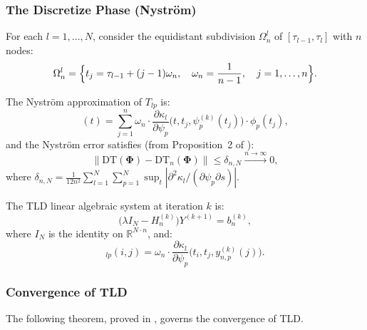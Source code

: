\documentclass[12pt, a4paper]{article}
\newcommand{\norm}[1]{\left\| #1 \right\|}
\newcommand{\abs}[1]{\left| #1 \right|}
\newcommand{\Hn}{H_{n}^{(k)}}
\newcommand{\DT}{\mathrm{DT}}
\newcommand{\DTn}{\mathrm{DT}_{n}}
\newcommand{\R}{\mathbb{R}}
\begin{document}
\subsubsection{The Discretize Phase (Nystr\"{o}m)}

For each $l = 1, \ldots, N$, consider the equidistant
subdivision $\Omega_n^l$ of $[\tau_{l-1}, \tau_l]$ with $n$
nodes:
\begin{equation*}
  \Omega_n^l = \Bigl\{
    t_j = \tau_{l-1} + (j-1)\omega_n,
    \quad \omega_n = \frac{1}{n-1},
    \quad j = 1, \ldots, n
  \Bigr\}.
\end{equation*}

The Nystr\"{o}m approximation of $T_{lp}$ is:
\begin{equation}
  [T_{n,lp}(\boldsymbol{\Psi}^{(k)}) \phi_p](t) =
  \sum_{j=1}^{n} \omega_n \cdot
  \frac{\partial \kappa_l}{\partial \psi_p}
  \bigl(t, t_j, \psi_p^{(k)}(t_j)\bigr)
  \cdot \phi_p(t_j),
  \label{eq:nystrom}
\end{equation}
and the Nystr\"{o}m error satisfies (from Proposition~2 of
\cite{sedka2025}):
\begin{equation}
  \norm{\DT(\boldsymbol{\Phi}) - \DTn(\boldsymbol{\Phi})}
  \leq \delta_{n,N}
  \xrightarrow{n \to \infty} 0,
  \label{eq:nysterror}
\end{equation}
where
$\delta_{n,N} = \frac{1}{12n^2} \sum_{l=1}^N \sum_{p=1}^N
\sup_{t} \abs{\partial^2 \kappa_l / (\partial \psi_p \partial s)}$.

The TLD linear algebraic system at iteration $k$ is:
\begin{equation}
  \bigl(\lambda I_N - \Hn\bigr) Y^{(k+1)} = b_n^{(k)},
  \label{eq:linsys_tld}
\end{equation}
where $I_N$ is the identity on $\R^{N \cdot n}$, and:
\begin{equation}
  [\Hn]_{lp}(i,j) =
  \omega_n \cdot
  \frac{\partial \kappa_l}{\partial \psi_p}
  \bigl(t_i, t_j, y_{n,p}^{(k)}(j)\bigr).
  \label{eq:Hn}
\end{equation}

\subsubsection{Convergence of TLD}

The following theorem, proved in \cite{sedka2025}, governs
the convergence of TLD.
\end{document}
